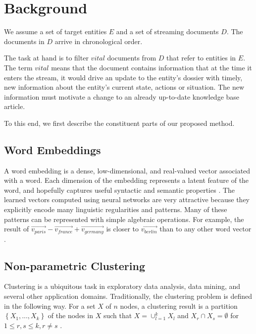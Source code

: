 \documentclass{article}
\begin{document}
\section{Background}
\label{background} 

We assume a set of target entities $E$ and a set of streaming documents $D$. The documents in $D$ arrive in chronological order.

The task at hand is to filter $vital$ documents from $D$ that refer to entities in $E$.
The term $vital$ means that the document contains information that at the time it enters the stream, it would drive an update to the entity's dossier with timely, new information about the entity's current state, actions or situation. The new information must motivate a change to an already up-to-date knowledge base article.

To this end, we first describe the constituent parts of our proposed method.

\subsection{Word Embeddings}

A word embedding is a dense, low-dimensional, and real-valued vector associated with a word. Each dimension of the embedding represents a latent feature of the word, and hopefully captures useful syntactic and semantic properties \cite{Turian10wordrepresentations}.
The learned vectors computed using neural networks are very attractive because they explicitly encode many linguistic regularities and patterns. Many of these patterns can be represented with simple algebraic operations. For example, the result of $\vec{v_{paris}} - \vec{v_{france}} + \vec{v_{germany}}$ is closer to $\vec{v_{berlin}}$ than to any other word vector \cite{mikolovChen,mikolovYih}.

\subsection{Non-parametric Clustering}

Clustering is a ubiquitous task in exploratory data analysis, data mining, and several other application domains. %
Traditionally, the clustering problem is defined in the following way. For a set $X$ of $n$ nodes, a clustering result is a partition $\left\{ {X_1, ..., X_k}\right\}$ of the nodes in $X$ such that $X=\cup_{l=1}^{k}{X_l}$ and $X_r \cap X_s = \emptyset$ for $1 \leq r,s \leq k, r \ne s$ \cite{ChiSZHT07}.
\end{document}
